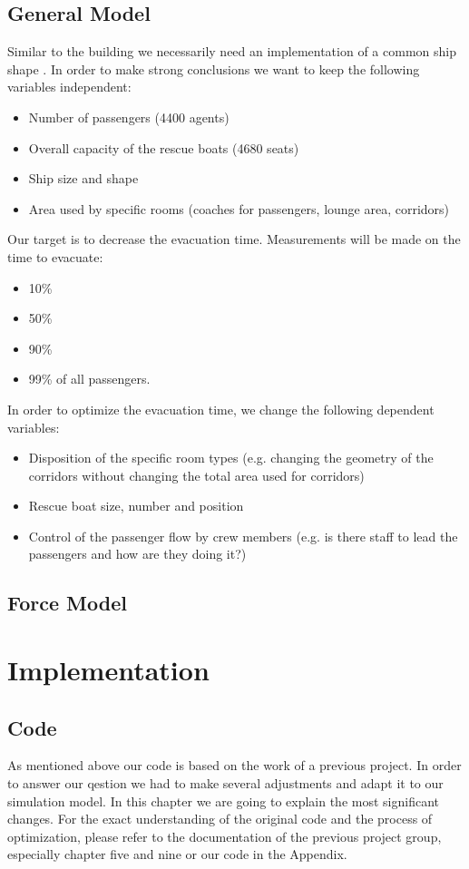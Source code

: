 \documentclass[11pt]{article}
\begin{document}
\subsection{General Model}
Similar to the building we necessarily need an  implementation of a common ship shape \cite{shipdecks}. In order to make strong conclusions we want to keep the following variables independent:
\begin{itemize}
\item Number of passengers (4400 agents)
\item Overall capacity of the rescue boats (4680 seats)
\item Ship size and shape
\item Area used by specific rooms (coaches for passengers, lounge area, corridors)
\end{itemize}
Our target is to decrease the evacuation time. Measurements will be made on the time to evacuate:
\begin{itemize}
\item 10\%
\item 50\%
\item 90\%
\item 99\% of all passengers.
\end{itemize}
In order to optimize the evacuation time, we change the following dependent variables:
\begin{itemize}
\item Disposition of the specific room types (e.g. changing the geometry of the corridors without changing the total area used for corridors)
\item Rescue boat size, number and position
\item Control of the passenger flow by crew members (e.g. is there staff to lead the passengers and how are they doing it?)
\end{itemize}

\subsection{Force Model}


\section{Implementation}
\subsection{Code}
As mentioned above our code is based on the work of a previous project. In order to answer our qestion we had to make several adjustments and adapt it to our simulation model. In this chapter we are going to explain the most significant changes. For the exact understanding of the original code and the process of optimization, please refer to the documentation of the previous project group, especially chapter five and nine\cite{Building} or our code in the Appendix.
\end{document}
